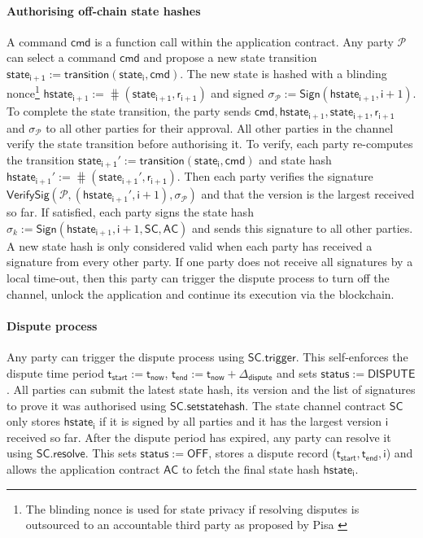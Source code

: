 \documentclass{llncs}
\newcommand{\chanstatus}{\mathsf{status}}
\newcommand{\chandispute}{\mathsf{DISPUTE}}
\newcommand{\chanoff}{\mathsf{OFF}}
\newcommand{\cmd}{\mathsf{cmd}}
\newcommand{\hstatei}{\mathsf{hstate}_{\monotoniccounter}}
\newcommand{\hstateplus}{\ensuremath{\mathsf{hstate}_{\monotoniccounter+1}}}
\newcommand{\monotoniccounter}{\mathsf{i}}
\newcommand{\stateinfoi}{\mathsf{state}_{\mathsf{i}}}
\newcommand{\stateinfoplus}{\mathsf{state}_{\mathsf{i+1}}}
\newcommand{\participant}{\mathcal{P}}
\newcommand{\ranplus}{\mathsf{r}_{\mathsf{i+1}}}
\newcommand{\statechannel}{\mathsf{SC}}
\newcommand{\statechanneldispute}{\mathsf{SC}.\mathsf{trigger}}
\newcommand{\statechannelsetstate}{\mathsf{SC}.\mathsf{setstatehash}}
\newcommand{\statechannelresolve}{\mathsf{SC}.\mathsf{resolve}}
\newcommand{\sign}{\mathsf{Sign}}
\newcommand{\verifysig}{\mathsf{VerifySig}}
\newcommand{\appcontract}{\mathsf{AC}}
\newcommand{\timenow}{\mathsf{t}_{\mathsf{now}}}
\newcommand{\timestart}{\mathsf{t}_{\mathsf{start}}}
\newcommand{\timeend}{\mathsf{t}_{\mathsf{end}}}
\newcommand{\timedispute}{\timenow + \mathsf{\Delta}_{\mathsf{dispute}}}
\begin{document}
	\paragraph{Authorising off-chain state hashes}
	A command $\cmd$ is a function call within the application contract.
	Any party $\participant$ can select a command $\cmd$ and propose a new state transition $\stateinfoplus := \mathsf{transition}(\stateinfoi, \cmd)$.
	The new state is hashed  with a blinding nonce\footnote{The blinding nonce is used for state privacy if resolving disputes is outsourced to an accountable third party as proposed by Pisa \cite{mccorry2018pisa}}  $\hstateplus := \hash(\stateinfoplus, \ranplus)$ and signed  $\sigma_{\participant} := \sign(\hstateplus,\monotoniccounter+1)$.
	To complete the state transition, the party sends $\cmd,\hstateplus, \stateinfoplus, \ranplus$ and $\sigma_{\participant}$ to all other parties for their approval.
	All other parties in the channel verify the state transition before authorising it. 
	To verify, each party re-computes the transition $\stateinfoplus' := \mathsf{transition}(\stateinfoi, \cmd)$ and state hash $\hstateplus' := \hash(\stateinfoplus', \ranplus)$.
	Then each party verifies the signature $\verifysig(\participant, (\hstateplus', \monotoniccounter+1), \sigma_{\participant})$ and that the version is the largest received so far. 
	If satisfied, each party signs the state hash  $\sigma_{k} := \sign(\hstateplus,\monotoniccounter+1, \statechannel, \appcontract)$ and sends this signature to all other parties. 
	A new state hash is only considered valid when each party has received a signature from every other party.  
	If one party does not receive all signatures by a local time-out, then this party can trigger the dispute process to turn off the channel, unlock the application and continue its execution via the blockchain. 
	
	\paragraph{Dispute process} 
	
	Any party can trigger the dispute process using $\statechanneldispute$.
	This self-enforces the dispute time period $\timestart := \timenow$, $\timeend := \timedispute$ and sets $\chanstatus := \chandispute$. 
	All parties can submit the latest state hash, its version and the list of signatures to prove it was authorised using $\statechannelsetstate$. 
	The state channel contract $\statechannel$ only stores $\hstatei$ if it is signed by all parties and it has the largest version $\monotoniccounter$ received so far. 
	After the dispute period has expired, any party can resolve it using $\statechannelresolve$.
	This sets $\chanstatus := \chanoff$, stores a dispute record ($\timestart,\timeend, \monotoniccounter$) and allows the application contract $\appcontract$ to fetch the final state hash $\hstatei$. 
	
\end{document}
